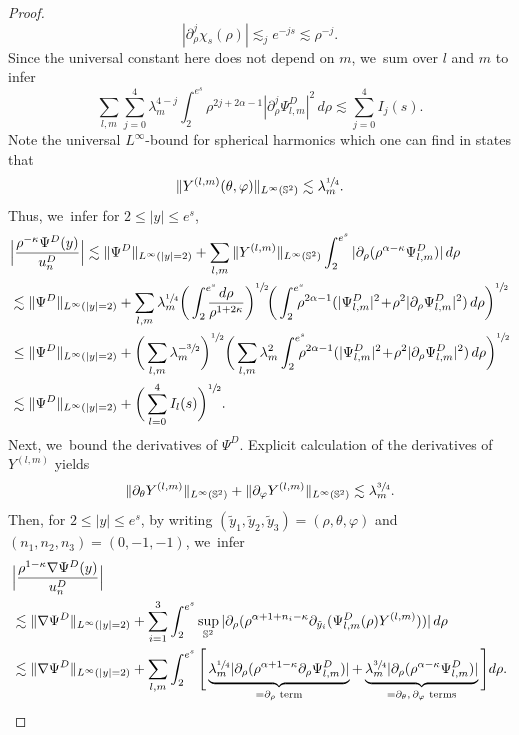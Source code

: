 \documentclass[JEP,XML,SOM,Unicode]{cedram}
\theoremstyle{plain}
\theoremstyle{definition}
\begin{document}
\begin{proof}
\[
|\partial_\rho^j\chi_s(\rho)|\lesssim_j e^{-js}\lesssim \rho^{-j}.
\]
Since the universal constant here does not depend on $m$, we~sum over $l$ and $m$ to infer
\[
\sum_{l,m}\sum_{j=0}^{4}\lambda_m^{4-j}\int_2^{e^s} \rho^{2j+2\alpha-1}|\partial_\rho^j \Psi_{l,m}^D|^2\,d\rho \lesssim \sum_{j=0}^4 I_j(s).
\]
Note the universal $L^\infty$-bound for spherical harmonics which one can find in \cite{TZ} states that
\[
\Vert Y^{(l,m)}(\theta,\varphi)\Vert_{L^\infty(\mathbb S^2)}\lesssim \lambda_m^{\sfrac{1}{4}}.
\]
Thus, we~infer for $2\le |y|\le e^s$,
\[
\begin{aligned}
&\Big|\frac{\rho^{-\kappa}\Psi^D(y)}{u_n^D}\Big|\lesssim \Vert \Psi^D\Vert_{L^\infty(|y|=2)}+\sum_{l,m}\Vert Y^{(l,m)}\Vert_{L^\infty(\mathbb S^2)}\int_2^{e^s}|\partial_\rho(\rho^{\alpha-\kappa}\Psi_{l,m}^D)|\,d\rho\\
&\lesssim \Vert \Psi^D\Vert_{L^\infty(|y|=2)}+\sum_{l,m}\lambda_m^{\sfrac{1}{4}}\bigg(\int_2^{e^s}\hspace*{-3mm}\frac{d\rho}{ \rho^{1+2\kappa}}\bigg)^{\sfrac{1}{2}}\!\bigg(\int_2^{e^s}\hspace*{-2.5mm}\rho^{2\alpha-1}(|\Psi_{l,m}^D|^2\!+\!\rho^2|\partial_\rho\Psi_{l,m}^D|^2)\,d\rho\bigg)^{\sfrac{1}{2}}\\
&\le \Vert \Psi^D\Vert_{L^\infty(|y|=2)}+\bigg(\sum_{l,m} \lambda_m^{-\sfrac{3}{2}}\bigg)^{\sfrac{1}{2}}\bigg(\sum_{l,m}\lambda_m^2\int_2^{e^s}\hspace*{-2.5mm}\rho^{2\alpha-1}(|\Psi_{l,m}^D|^2\!+\!\rho^2|\partial_\rho\Psi_{l,m}^D|^2)\,d\rho\bigg)^{\sfrac{1}{2}}\\
&\lesssim \Vert \Psi^D\Vert_{L^\infty(|y|=2)}+ \bigg(\sum_{l=0}^4I_l(s)\bigg)^{\sfrac{1}{2}}.
\end{aligned}
\]
Next, we~bound the derivatives of $\Psi^D$. Explicit calculation of the derivatives of $Y^{(l,m)}$ yields
\[
\Vert \partial_\theta Y^{(l,m)}\Vert_{L^\infty(\mathbb S^2)}+\Vert \partial_\varphi Y^{(l,m)}\Vert_{L^\infty(\mathbb S^2)}\lesssim \lambda_m^{\sfrac{3}{4}}.
\]
Then, for $2\le |y|\le e^s$, by writing $(\tilde y_1,\tilde y_2,\tilde y_3)=(\rho,\theta,\varphi)$ and $(n_1,n_2,n_3)=(0,-1,-1)$, we~infer
\[
\begin{aligned}
& \Big |\frac{\rho^{1-\kappa}\nabla\Psi^D(y)}{u_n^D} \Big |\\
&\lesssim \Vert \nabla\Psi^D\Vert_{L^\infty(|y|=2)}+\sum_{i=1}^3\int_2^{e^s}\sup_{\mathbb S^2}|\partial_\rho(\rho^{\alpha+1+n_i-\kappa}\partial_{\tilde y_i}(\Psi_{l,m}^D(\rho)Y^{(l,m)}))|\,d\rho\\
&\lesssim \Vert \nabla\Psi^D\Vert_{L^\infty(|y|=2)}+\sum_{l,m}\int_2^{e^s}\Bigg[\underbrace{\lambda_m^{\sfrac{1}{4}}|\partial_\rho(\rho^{\alpha+1-\kappa}\partial_\rho\Psi_{l,m}^D)|}_{=\partial_\rho \text{ term}}+\underbrace{\lambda_m^{\sfrac{3}{4}}|\partial_\rho(\rho^{\alpha-\kappa}\Psi_{l,m}^D)|}_{=\partial_\theta,\,\partial_\varphi\text{ terms}}\Bigg]d\rho.

\end{aligned}\]
\end{proof}
\end{document}
